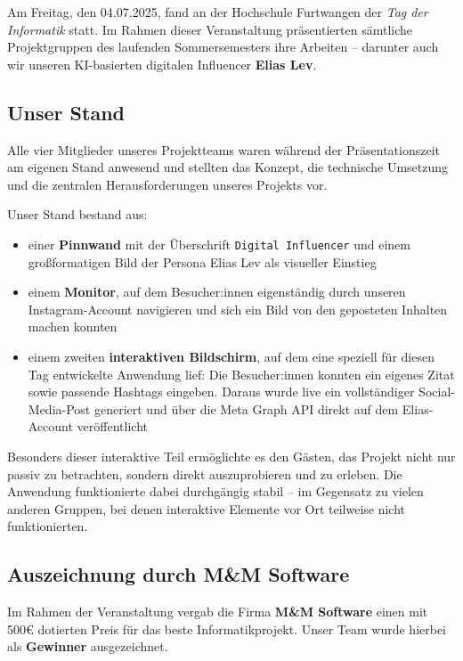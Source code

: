 \documentclass[a4paper,12pt]{article}
\begin{document}
Am Freitag, den 04.07.2025, fand an der Hochschule Furtwangen der \textit{Tag der Informatik} statt. Im Rahmen dieser Veranstaltung präsentierten sämtliche Projektgruppen des laufenden Sommersemesters ihre Arbeiten – darunter auch wir unseren KI-basierten digitalen Influencer \textbf{Elias Lev}.

\subsection{Unser Stand}

Alle vier Mitglieder unseres Projektteams waren während der Präsentationszeit am eigenen Stand anwesend und stellten das Konzept, die technische Umsetzung und die zentralen Herausforderungen unseres Projekts vor.

Unser Stand bestand aus:

\begin{itemize}
    \item einer \textbf{Pinnwand} mit der Überschrift \texttt{Digital Influencer} und einem großformatigen Bild der Persona Elias Lev als visueller Einstieg
    \item einem \textbf{Monitor}, auf dem Besucher:innen eigenständig durch unseren Instagram-Account navigieren und sich ein Bild von den geposteten Inhalten machen konnten
    \item einem zweiten \textbf{interaktiven Bildschirm}, auf dem eine speziell für diesen Tag entwickelte Anwendung lief: Die Besucher:innen konnten ein eigenes Zitat sowie passende Hashtags eingeben. Daraus wurde live ein vollständiger Social-Media-Post generiert und über die Meta Graph API direkt auf dem Elias-Account veröffentlicht
\end{itemize}

Besonders dieser interaktive Teil ermöglichte es den Gästen, das Projekt nicht nur passiv zu betrachten, sondern direkt auszuprobieren und zu erleben. Die Anwendung funktionierte dabei durchgängig stabil – im Gegensatz zu vielen anderen Gruppen, bei denen interaktive Elemente vor Ort teilweise nicht funktionierten.

\subsection{Auszeichnung durch M\&M Software}

Im Rahmen der Veranstaltung vergab die Firma \textbf{M\&M Software} einen mit 500€ dotierten Preis für das beste Informatikprojekt. Unser Team wurde hierbei als \textbf{Gewinner} ausgezeichnet.
\end{document}
